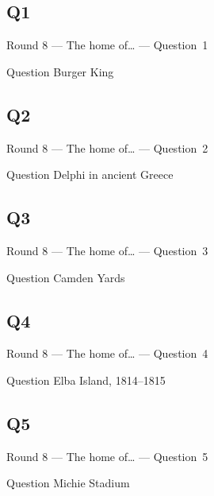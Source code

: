 \documentclass[11pt]{beamer}
\begin{document}
\subsection*{Q1}
\begin{frame}[t]{Round 8 --- The home of\ldots{} --- \mbox{Question 1}}
\vspace{-0.5em}
\begin{block}{Question}
Burger King
\end{block}
\end{frame}
\subsection*{Q2}
\begin{frame}[t]{Round 8 --- The home of\ldots{} --- \mbox{Question 2}}
\vspace{-0.5em}
\begin{block}{Question}
Delphi in ancient Greece
\end{block}
\end{frame}
\subsection*{Q3}
\begin{frame}[t]{Round 8 --- The home of\ldots{} --- \mbox{Question 3}}
\vspace{-0.5em}
\begin{block}{Question}
Camden Yards
\end{block}
\end{frame}
\subsection*{Q4}
\begin{frame}[t]{Round 8 --- The home of\ldots{} --- \mbox{Question 4}}
\vspace{-0.5em}
\begin{block}{Question}
Elba Island, 1814--1815
\end{block}
\end{frame}
\subsection*{Q5}
\begin{frame}[t]{Round 8 --- The home of\ldots{} --- \mbox{Question 5}}
\vspace{-0.5em}
\begin{block}{Question}
Michie Stadium
\end{block}
\end{frame}
\end{document}
